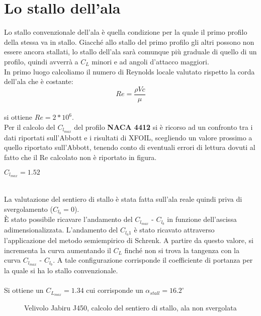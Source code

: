 \chapter {Lo stallo dell'ala}

Lo stallo convenzionale dell’ala è quella condizione per la quale il primo profilo della stessa va in stallo. Giacché allo stallo del primo profilo gli altri possono non essere ancora stallati, lo stallo dell’ala sarà comunque più graduale di quello di un profilo, quindi avverrà a $C_L$ minori e ad angoli d’attacco maggiori.\\
In primo luogo calcoliamo il numero di Reynolds locale valutato rispetto la corda dell’ala che è costante:
\begin{equation}
\label{eqn:re}
Re=\frac{{\rho}Vc}{\mu}
\end{equation}
\noindent \\
si ottiene $Re=2*10^6$.\\
Per il calcolo del $C_{l_{max}}$ del profilo {\bfseries NACA 4412}  si è ricorso ad un confronto tra i dati riportati sull’Abbott \cite{prof:jane} e i risultati di XFOIL, scegliendo un valore prossimo a quello riportato sull'Abbott, tenendo conto di eventuali errori di lettura dovuti al fatto che il Re calcolato non è riportato in figura. \\

\begin{center}
$ C_{l_{max}}=1.52 $
\end {center}

\noindent \\
La valutazione del sentiero di stallo è stata fatta sull’ala reale quindi priva di svergolamento ($C_{l_b}=0$).\\
È stato possibile ricavare l’andamento del $C_{l_{max}}$ - $C_{l_b}$ in funzione dell’ascissa adimensionalizzata.
L’andamento del $C_{l_a1}$ è stato ricavato attraverso l’applicazione del metodo semiempirico di Schrenk. A partire da questo valore, si incrementa la curva aumentando il $C_L$ finché non si trova la tangenza con la curva $C_{l_{max}}$ - $C_{l_b}$. A tale configurazione corrisponde il coefficiente di portanza per la quale si ha lo stallo convenzionale.\\ \\
Si ottiene un $C_{L_{max}}=1.34$ cui corrisponde un $\alpha_{stall}=16.2 ^\circ$


\begin{figure} [h]
\centering
{}
\caption{\footnotesize Velivolo Jabiru J450, calcolo del sentiero di stallo, ala non svergolata}
\end{figure}
